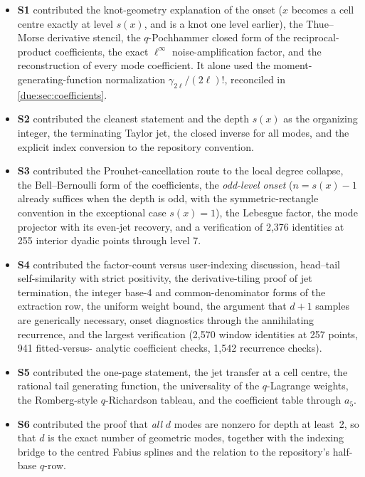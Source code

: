 \documentclass[11pt,oneside]{article}
\theoremstyle{plain}
\theoremstyle{definition}
\theoremstyle{remark}
\newcommand{\dep}[1]{s\!\left(#1\right)}                    %
\newcommand{\am}[1]{a_{#1}}                                 %
\begin{document}
\begin{itemize}
\item \textbf{S1} contributed the knot-geometry explanation of the onset
  (\(x\) becomes a cell centre exactly at level \(\dep{x}\), and is a knot one
  level earlier), the Thue--Morse derivative stencil, the
  \(q\)-Pochhammer closed form of the reciprocal-product coefficients, the
  exact \(\ell^{\infty}\) noise-amplification factor, and the reconstruction
  of every mode coefficient.  It alone used the moment-generating-function
  normalization \(\gamma_{2\ell}/(2\ell)!\), reconciled in
  \cref{due:sec:coefficients}.
\item \textbf{S2} contributed the cleanest statement and the depth
  \(\dep{x}\) as the organizing integer, the terminating Taylor jet, the
  closed inverse for all modes, and the explicit index conversion to the
  repository convention.
\item \textbf{S3} contributed the Prouhet-cancellation route to the local
  degree collapse, the Bell--Bernoulli form of the coefficients, the
  \emph{odd-level onset} (\(n=\dep{x}-1\) already suffices when the depth is
  odd, with the symmetric-rectangle convention in the exceptional case
  \(\dep{x}=1\)), the Lebesgue factor, the mode projector with its even-jet
  recovery, and a verification of 2{,}376 identities at 255 interior dyadic
  points through level 7.
\item \textbf{S4} contributed the factor-count versus user-indexing
  discussion, head--tail self-similarity with strict positivity, the
  derivative-tiling proof of jet termination, the integer base-4 and
  common-denominator forms of the extraction row, the uniform weight bound,
  the argument that \(d+1\) samples are generically necessary, onset
  diagnostics through the annihilating recurrence, and the largest
  verification (2{,}570 window identities at 257 points, 941 fitted-versus-
  analytic coefficient checks, 1{,}542 recurrence checks).
\item \textbf{S5} contributed the one-page statement, the jet transfer at a
  cell centre, the rational tail generating function, the universality of the
  \(q\)-Lagrange weights, the Romberg-style \(q\)-Richardson tableau, and the
  coefficient table through \(\am{5}\).
\item \textbf{S6} contributed the proof that \emph{all} \(d\) modes are
  nonzero for depth at least~2, so that \(d\) is the exact number of geometric
  modes, together with the indexing bridge to the centred Fabius splines and
  the relation to the repository's half-base \(q\)-row.
\end{itemize}
\end{document}
